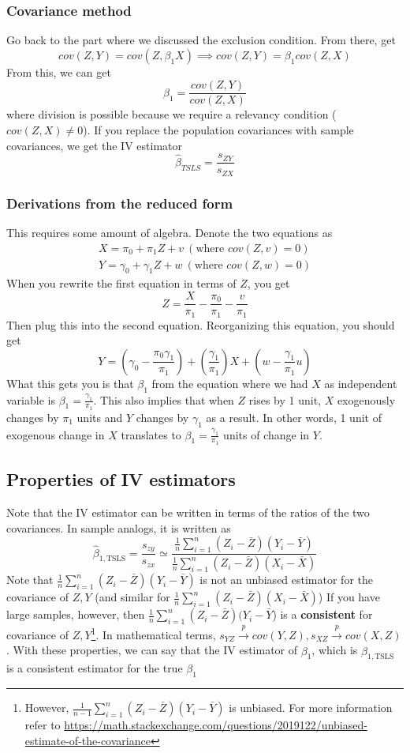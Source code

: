 \documentclass[12pt]{article}
\theoremstyle{definition}
\theoremstyle{property}
\theoremstyle{assumption}
\theoremstyle{example}
\theoremstyle{comment}
\begin{document}
\subsubsection{Covariance method}
Go back to the part where we discussed the exclusion condition. From there, get
\[
cov(Z,Y)=cov(Z,\beta_1X) \implies cov(Z,Y)=\beta_1cov(Z,X)
\]
From this, we can get
\[
\beta_1=\frac{cov(Z,Y)}{cov(Z,X)}
\]
where division is possible because we require a relevancy condition ($cov(Z,X)\neq0$). If you replace the population covariances with sample covariances, we get the IV estimator
\[
\hat{\beta}_{TSLS}=\frac{s_{ZY}}{s_{ZX}}
\]
\subsubsection{Derivations from the reduced form}
This requires some amount of algebra. Denote the two equations as
\begin{gather*}
X=\pi_0+\pi_1Z+v \ (\text{where }cov(Z,v)=0)\\ Y=\gamma_0+\gamma_1Z+w \ (\text{where }cov(Z,w)=0)
\end{gather*}
When you rewrite the first equation in terms of $Z$, you get
\[
Z=\frac{X}{\pi_1}-\frac{\pi_0}{\pi_1}-\frac{v}{\pi_1}
\]
Then plug this into the second equation. Reorganizing this equation, you should get
\[
Y=\left(\gamma_0-\frac{\pi_0\gamma_1}{\pi_1}\right)+\left(\frac{\gamma_1}{\pi_1}\right)X+\left(w-\frac{\gamma_1}{\pi_1}u\right)
\]
What this gets you is that $\beta_1$ from the equation where we had $X$ as independent variable is $\beta_1 = \frac{\gamma_1}{\pi_1}$. This also implies that when $Z$ rises by 1 unit, $X$ exogenously changes by $\pi_1$ units and $Y$ changes by $\gamma_1$ as a result. In other words, 1 unit of exogenous change in $X$ translates to  $\beta_1 = \frac{\gamma_1}{\pi_1}$ units of change in $Y$. \par\medskip



\subsection{Properties of IV estimators}
Note that the IV estimator can be written in terms of the ratios of the two covariances. In sample analogs, it is written as
\[
\hat{\beta}_{1,\text{TSLS}}=\frac{s_{zy}}{s_{zx}}\simeq\frac{\frac{1}{n}\sum_{i=1}^n(Z_i-\bar{Z})(Y_i-\bar{Y})}{\frac{1}{n}\sum_{i=1}^n(Z_i-\bar{Z})(X_i-\bar{X})}
\]
Note that $\frac{1}{n}\sum_{i=1}^n(Z_i-\bar{Z})(Y_i-\bar{Y})$ is not an unbiased estimator for the covariance of $Z,Y$ (and similar for $\frac{1}{n}\sum_{i=1}^n(Z_i-\bar{Z})(X_i-\bar{X})$) If you have large samples, however, then $\frac{1}{n}\sum_{i=1}^n(Z_i-\bar{Z})(Y_i-\bar{Y}$) is a \textbf{consistent} for covariance of $Z,Y$\footnote{However, $\frac{1}{n-1}\sum_{i=1}^n(Z_i-\bar{Z})(Y_i-\bar{Y})$ is unbiased. For more information refer to \url{https://math.stackexchange.com/questions/2019122/unbiased-estimate-of-the-covariance}}. In mathematical terms, $s_{YZ}\xrightarrow{p} cov(Y,Z),  s_{XZ}\xrightarrow{p} cov(X,Z)$. With these properties, we can say that the IV estimator of $\beta_1$, which is $\hat{\beta}_{1,\text{TSLS}}$ is a consistent estimator for the true $\beta_1$ \par\medskip
\end{document}
